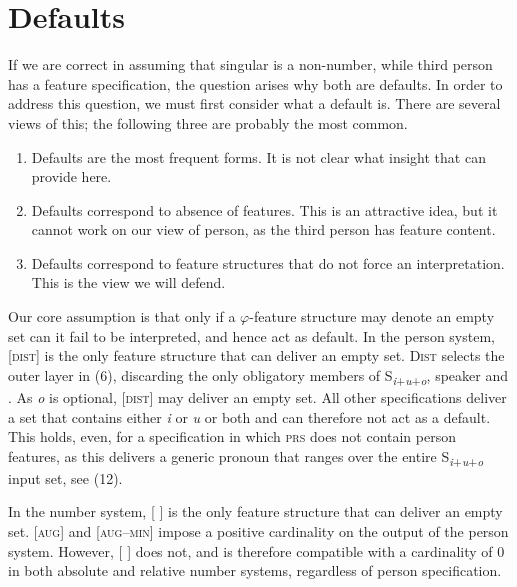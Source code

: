 \documentclass[output=paper]{langsci/langscibook}
\begin{document}
\section{Defaults}

If we are correct in assuming that singular is a non-number, while third person has a feature specification, the question arises why both are defaults. In order to address this question, we must first consider what a default is. There are several views of this; the following three are probably the most common. 

\begin{enumerate}[label=(\roman*)]
\item Defaults are the most frequent forms. It is not clear what insight that can provide here. 
\item Defaults correspond to absence of features. This is an attractive idea, but it cannot work on our view of person, as the third person has feature content. 
\item Defaults correspond to feature structures that do not force an interpretation. This is the view we will defend.
\end{enumerate}

  Our core assumption is that only if a $\varphi $-feature structure may denote an empty set can it fail to be interpreted, and hence act as default. In the person system, [\textsc{dist}] is the only feature structure that can deliver an empty set. \textsc{Dist} selects the outer layer in (6), discarding the only obligatory members of S\textit{\textsubscript{i}}\textsubscript{+}\textit{\textsubscript{u}}\textsubscript{+}\textit{\textsubscript{o}}, speaker and . As \textit{o} is optional, [\textsc{dist}] may deliver an empty set. All other specifications deliver a set that contains either \textit{i} or \textit{u} or both and can therefore not act as a default. This holds, even, for a specification in which \textsc{prs} does not contain person features, as this delivers a generic  pronoun that ranges over the entire S\textit{\textsubscript{i}}\textsubscript{+}\textit{\textsubscript{u}}\textsubscript{+}\textit{\textsubscript{o}} input set, see (12).

In the number system, [ ] is the only feature structure that can deliver an empty set. [\textsc{aug}] and [\textsc{aug}–\textsc{min}] impose a positive cardinality on the output of the person system. However, [ ] does not, and is therefore compatible with a cardinality of 0 in both absolute and relative number systems, regardless of person specification. 
\end{document}
